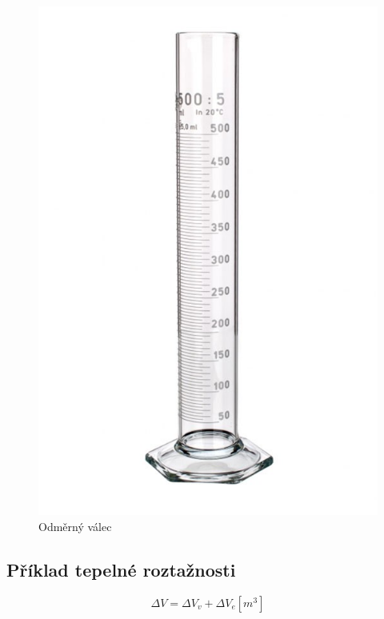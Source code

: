 \begin{figure}[!h]
    \begin{center}
        \includegraphics[scale=0.4]{obrazky/odměrný válec.jpg}
    \end{center}
    \caption{Odměrný válec \cite{Odměrný válec}}
\end{figure}

\subsection{Příklad tepelné roztažnosti}
\begin{equation}
\label{objem_kapalina}
    \Delta V = \Delta V_v + \Delta V_e \left[m^3\right]
\end{equation}


